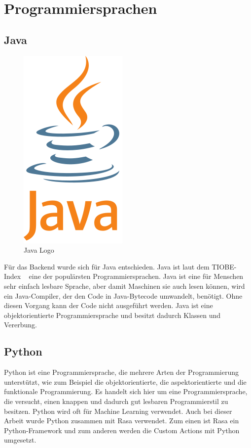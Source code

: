 \section{Programmiersprachen}

\subsection{Java}

\begin{figure}[hbt!]
    \centering
    \includegraphics[scale=0.5]{pics/java}
    \caption{Java Logo\cite{java}}
    \label{fig:impl:java}
\end{figure}

Für das Backend wurde sich für Java entschieden.
Java ist laut dem TIOBE-Index ~\cite{tiobe} eine der populärsten Programmiersprachen.
Java ist eine für Menschen sehr einfach lesbare Sprache, aber damit Maschinen sie auch lesen können, wird ein Java-Compiler, der den Code in Java-Bytecode umwandelt, benötigt.
Ohne diesen Vorgang kann der Code nicht ausgeführt werden.
Java ist eine objektorientierte Programmiersprache und besitzt dadurch Klassen und Vererbung\cite{java}.

\subsection{Python}

Python ist eine Programmiersprache, die mehrere Arten der Programmierung unterstützt, wie zum Beispiel die objektorientierte, die aspektorientierte und die funktionale Programmierung.
Es handelt sich hier um eine Programmiersprache, die versucht, einen knappen und dadurch gut lesbaren Programmierstil zu besitzen.
Python wird oft für Machine Learning verwendet.
Auch bei dieser Arbeit wurde Python zusammen mit Rasa verwendet.
Zum einen ist Rasa ein Python-Framework und zum anderen werden die Custom Actions mit Python umgesetzt.

